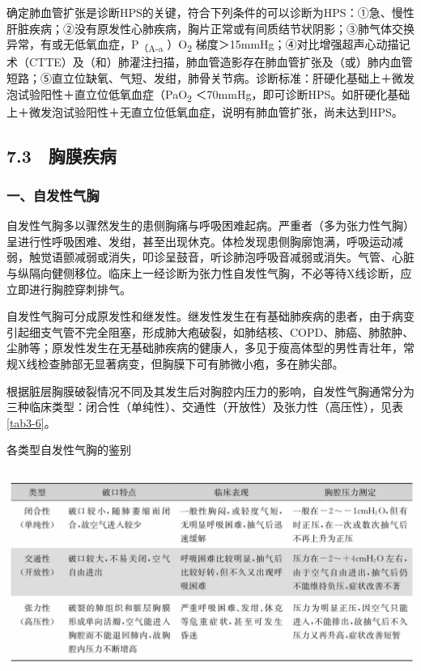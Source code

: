 确定肺血管扩张是诊断HPS的关键，符合下列条件的可以诊断为HPS：①急、慢性肝脏疾病；②没有原发性心肺疾病，胸片正常或有间质结节状阴影；③肺气体交换异常，有或无低氧血症，P\textsubscript{（A-a}
）O\textsubscript{2}
梯度＞15mmHg；④对比增强超声心动描记术（CTTE）及（和）肺灌注扫描，肺血管造影存在肺血管扩张及（或）肺内血管短路；⑤直立位缺氧、气短、发绀，肺骨关节病。诊断标准：肝硬化基础上＋微发泡试验阳性＋直立位低氧血症（PaO\textsubscript{2}
＜70mmHg，即可诊断HPS。如肝硬化基础上＋微发泡试验阳性＋无直立位低氧血症，说明有肺血管扩张，尚未达到HPS。

\protect\hypertarget{text00047.html}{}{}

\subsection{7.3　胸膜疾病}

\subsubsection{一、自发性气胸}

自发性气胸多以骤然发生的患侧胸痛与呼吸困难起病。严重者（多为张力性气胸）呈进行性呼吸困难、发绀，甚至出现休克。体检发现患侧胸廓饱满，呼吸运动减弱，触觉语颤减弱或消失，叩诊呈鼓音，听诊肺泡呼吸音减弱或消失。气管、心脏与纵隔向健侧移位。临床上一经诊断为张力性自发性气胸，不必等待X线诊断，应立即进行胸腔穿刺排气。

自发性气胸可分成原发性和继发性。继发性发生在有基础肺疾病的患者，由于病变引起细支气管不完全阻塞，形成肺大疱破裂，如肺结核、COPD、肺癌、肺脓肿、尘肺等；原发性发生在无基础肺疾病的健康人，多见于瘦高体型的男性青壮年，常规X线检查肺部无显著病变，但胸膜下可有肺微小疱，多在肺尖部。

根据脏层胸膜破裂情况不同及其发生后对胸腔内压力的影响，自发性气胸通常分为三种临床类型：闭合性（单纯性）、交通性（开放性）及张力性（高压性），见表\ref{tab3-6}。

\begin{table}[htbp]
\centering
\caption{各类型自发性气胸的鉴别}
\label{tab3-6}
\includegraphics[width=5.91667in,height=2.65625in]{./images/Image00037.jpg}
\end{table}


